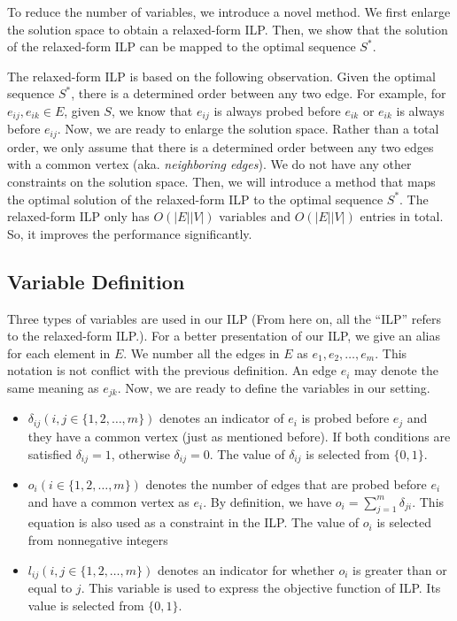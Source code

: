 \documentclass[letterpaper]{article}
\begin{document}
To reduce the number of variables, we introduce a novel method.
We first enlarge the solution space to obtain a relaxed-form ILP.
Then, we show that the solution of the relaxed-form ILP can be mapped to the optimal sequence $S^*$.

The relaxed-form ILP is based on the following observation.
Given the optimal sequence $S^*$, there is a determined order between any two edge.
For example, for $e_{ij}, e_{ik}\in E$, given $S$, we know that $e_{ij}$ is always probed before $e_{ik}$ or $e_{ik}$ is always before $e_{ij}$.
Now, we are ready to enlarge the solution space.
Rather than a total order, we only assume that there is a determined order between any two edges with a common vertex (aka. \textit{neighboring edges}).
We do not have any other constraints on the solution space.
Then, we will introduce a method that maps the optimal solution of the relaxed-form ILP to the optimal sequence $S^*$.
The relaxed-form ILP only has $O(|E||V|)$ variables and $O(|E||V|)$ entries in total.
So, it improves the performance significantly.

\subsection{Variable Definition}

Three types of variables are used in our ILP (From here on, all the ``ILP'' refers to the relaxed-form ILP.).
For a better presentation of our ILP, we give an alias for each element in $E$.
We number all the edges in $E$ as $e_1,e_2,\ldots,e_m$.
This notation is not conflict with the previous definition.
An edge $e_i$ may denote the same meaning as $e_{jk}$.
Now, we are ready to define the variables in our setting.
\begin{itemize}
	\item $\delta_{ij}(i,j\in\{1,2,\ldots,m\})$ denotes an indicator of $e_i$ is probed before $e_j$ and they have a common vertex (just as mentioned before). If both conditions are satisfied $\delta_{ij}=1$, otherwise $\delta_{ij}=0$. The value of $\delta_{ij}$ is selected from $\{0,1\}$.
	\item $o_i(i\in\{1,2,\ldots,m\})$ denotes the number of edges that are probed before $e_i$ and have a common vertex as $e_i$. By definition, we have $o_i=\sum_{j=1}^{m}\delta_{ji}$. This equation is also used as a constraint in the ILP. The value of $o_i$ is selected from nonnegative integers
	\item $l_{ij}(i,j\in\{1,2,\ldots,m\})$ denotes an indicator for whether $o_i$ is greater than or equal to $j$. This variable is used to express the objective function of ILP. Its value is selected from $\{0,1\}$.
\end{itemize}
\end{document}

